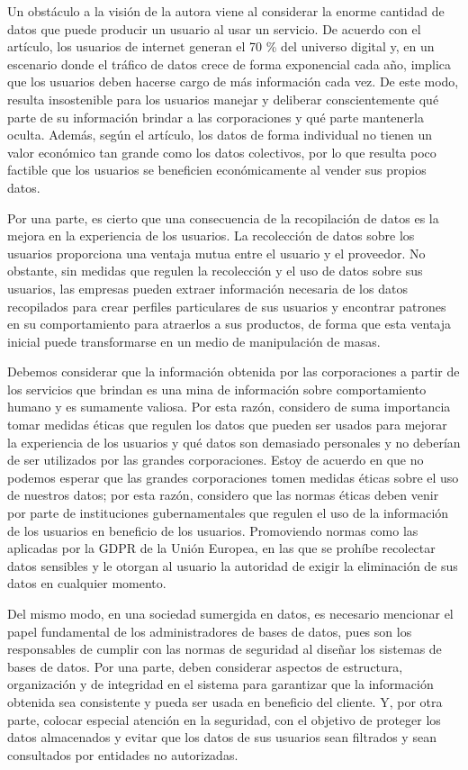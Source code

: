Un obstáculo a la visión de la autora viene al considerar la enorme cantidad de datos que puede producir un usuario al usar un servicio. De acuerdo con el artículo, los usuarios de internet generan el 70 \% del universo digital y, en un escenario donde el tráfico de datos crece de forma exponencial cada año, implica que los usuarios deben hacerse cargo de más información cada vez. De este modo, resulta insostenible para los usuarios manejar y deliberar conscientemente qué parte de su información brindar a las corporaciones y qué parte mantenerla oculta. Además, según el artículo, los datos de forma individual no tienen un valor económico tan grande como los datos colectivos, por lo que resulta poco factible que los usuarios se beneficien económicamente al vender sus propios datos.

Por una parte, es cierto que una consecuencia de la recopilación de datos es la mejora en la experiencia de los usuarios. La recolección de datos sobre los usuarios proporciona una ventaja mutua entre el usuario y el proveedor. No obstante, sin medidas que regulen la recolección y el uso de datos sobre sus usuarios, las empresas pueden extraer información necesaria de los datos recopilados para crear perfiles particulares de sus usuarios y encontrar patrones en su comportamiento para atraerlos a sus productos, de forma que esta ventaja inicial puede transformarse en un medio de manipulación de masas.

Debemos considerar que la información obtenida por las corporaciones a partir de los servicios que brindan es una mina de información sobre comportamiento humano y es sumamente valiosa. Por esta razón, considero de suma importancia tomar medidas éticas que regulen los datos que pueden ser usados para mejorar la experiencia de los usuarios y qué datos son demasiado personales y no deberían de ser utilizados por las grandes corporaciones. Estoy de acuerdo en que no podemos esperar que las grandes corporaciones tomen medidas éticas sobre el uso de nuestros datos; por esta razón, considero que las normas éticas deben venir por parte de instituciones gubernamentales que regulen el uso de la información de los usuarios en beneficio de los usuarios. Promoviendo normas como las aplicadas por la GDPR de la Unión Europea, en las que se prohíbe recolectar datos sensibles y le otorgan al usuario la autoridad de exigir la eliminación de sus datos en cualquier momento.

Del mismo modo, en una sociedad sumergida en datos, es necesario mencionar el papel fundamental de los administradores de bases de datos, pues son los responsables de cumplir con las normas de seguridad al diseñar los sistemas de bases de datos. Por una parte, deben considerar aspectos de estructura, organización y de integridad en el sistema para garantizar que la información obtenida sea consistente y pueda ser usada en beneficio del cliente. Y, por otra parte, colocar especial atención en la seguridad, con el objetivo de proteger los datos almacenados y evitar que los datos de sus usuarios sean filtrados y sean consultados por entidades no autorizadas.

